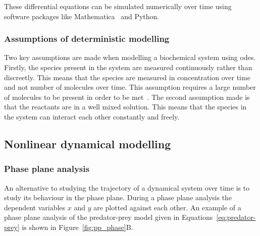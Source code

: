 \noindent These differential equations can be simulated numerically over time using software packages like Mathematica~\autocite{mathematica:2016} and Python.

\subsubsection{Assumptions of deterministic modelling}

Two key assumptions are made when modelling a biochemical system using \acrshort{ode}s. Firstly, the species present in the system are measured continuously rather than discreetly. This means that the species are measured in concentration over time and not number of molecules over time. This assumption requires a large number of molecules to be present in order to be met~\autocite{iglesias:2010}. The second assumption made is that the reactants are in a well mixed solution. This means that the species in the system can interact each other constantly and freely. 


\subsection{Nonlinear dynamical modelling}

\subsubsection{Phase plane analysis}
An alternative to studying the trajectory of a dynamical system over time is to study its behaviour in the phase plane. During a phase plane analysis the dependent variables $x$ and $y$ are plotted against each other. An example of a phase plane analysis of the predator-prey model given in Equations~\ref{eq:predator-prey} is shown in Figure~\ref{fig:pp_phase}B.

